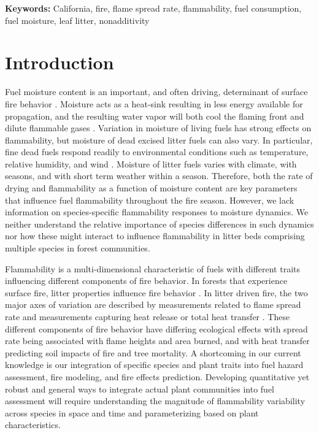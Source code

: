 \documentclass[letterpaper,12pt]{article}
\begin{document}
\noindent \textbf{Keywords:} California, fire, flame spread rate, flammability,
fuel consumption, fuel moisture, leaf litter, nonadditivity

\newpage

\section*{Introduction}

Fuel moisture content is an important, and often driving, determinant of
surface fire behavior \citep{Rothermel-1972}. Moisture acts as a heat-sink
resulting in less energy available for propagation, and the resulting water
vapor will both cool the flaming front and dilute flammable gases
\citep{Albini-1976, Shafizadeh-1977}. Variation in moisture of living fuels has
strong effects on flammability, but moisture of dead excised litter fuels can
also vary. In particular, fine dead fuels respond readily to environmental
conditions such as temperature, relative humidity, and wind \citep{Nelson-2001,
  Kreye+Varner+etal-2018}. Moisture of litter fuels varies with climate, with
seasons, and with short term weather within a season. Therefore, both the rate
of drying and flammability as a function of moisture content are key parameters
that influence fuel flammability throughout the fire season. However, we lack
information on species-specific flammability responses to moisture dynamics. We
neither understand the relative importance of species differences in such
dynamics nor how these might interact to influence flammability in litter beds
comprising multiple species in forest communities.

Flammability is a multi-dimensional characteristic of fuels
\citep{Schwilk-2015, Pausas+Keeley+etal-2017} with different traits influencing
different components of fire behavior. In forests that experience surface fire,
litter properties influence fire behavior \citep{Ganteaume+Marielle+etal-2011,
  Schwilk+Caprio-2011, Varner+Kane+etal-2015}. In litter driven fire, the two
major axes of variation are described by measurements related to flame spread
rate and measurements capturing heat release or total heat transfer
\citep{Magalhaes+Schwilk-2012, Prior+Murphy+etal-2018}. These different
components of fire behavior have differing ecological effects with spread rate
being associated with flame heights and area burned, and with heat transfer
predicting soil impacts of fire and tree mortality. A shortcoming in our
current knowledge is our integration of specific species and plant traits into
fuel hazard assessment, fire modeling, and fire effects prediction. Developing
quantitative yet robust and general ways to integrate actual plant communities
into fuel assessment will require understanding the magnitude of flammability
variability across species in space and time and parameterizing based on plant
characteristics.
\end{document}
